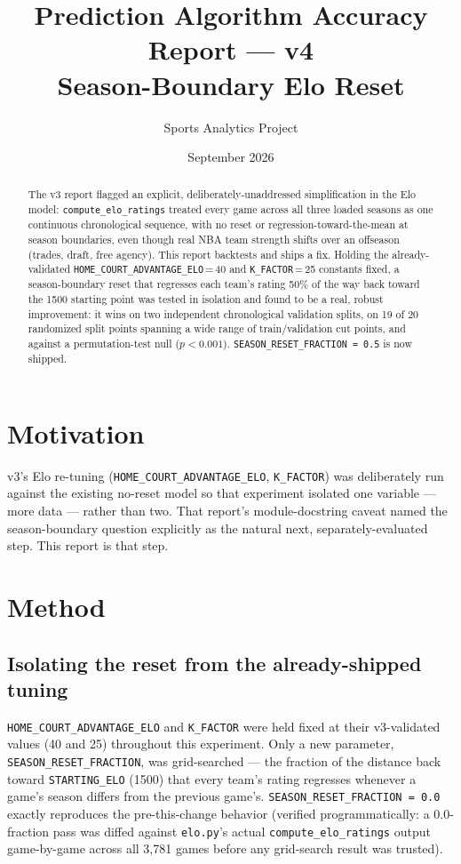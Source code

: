 \documentclass[11pt]{article}
\title{\textbf{Prediction Algorithm Accuracy Report — v4} \\ \large Season-Boundary Elo Reset}
\author{Sports Analytics Project}
\date{September 2026}
\newcommand{\code}[1]{\allowbreak\texttt{\small #1}\allowbreak}
\begin{document}
\maketitle

\begin{abstract}
\noindent The v3 report flagged an explicit, deliberately-unaddressed simplification in the Elo model:
\code{compute\_elo\_ratings} treated every game across all three loaded seasons as one continuous
chronological sequence, with no reset or regression-toward-the-mean at season boundaries, even though real
NBA team strength shifts over an offseason (trades, draft, free agency). This report backtests and ships a
fix. Holding the already-validated \code{HOME\_COURT\_ADVANTAGE\_ELO}\,=\,40 and \code{K\_FACTOR}\,=\,25
constants fixed, a season-boundary reset that regresses each team's rating 50\% of the way back toward the
1500 starting point was tested in isolation and found to be a real, robust improvement: it wins on two
independent chronological validation splits, on 19 of 20 randomized split points spanning a wide range of
train/validation cut points, and against a permutation-test null ($p < 0.001$). \code{SEASON\_RESET\_FRACTION
= 0.5} is now shipped.
\end{abstract}

\tableofcontents

\section{Motivation}

v3's Elo re-tuning (\code{HOME\_COURT\_ADVANTAGE\_ELO}, \code{K\_FACTOR}) was deliberately run against the
existing no-reset model so that experiment isolated one variable — more data — rather than two. That
report's module-docstring caveat named the season-boundary question explicitly as the natural next,
separately-evaluated step. This report is that step.

\section{Method}

\subsection{Isolating the reset from the already-shipped tuning}

\code{HOME\_COURT\_ADVANTAGE\_ELO} and \code{K\_FACTOR} were held fixed at their v3-validated values (40 and
25) throughout this experiment. Only a new parameter, \code{SEASON\_RESET\_FRACTION}, was grid-searched —
the fraction of the distance back toward \code{STARTING\_ELO} (1500) that every team's rating regresses
whenever a game's season differs from the previous game's. \code{SEASON\_RESET\_FRACTION = 0.0} exactly
reproduces the pre-this-change behavior (verified programmatically: a 0.0-fraction pass was diffed against
\code{elo.py}'s actual \code{compute\_elo\_ratings} output game-by-game across all 3,781 games before any
grid-search result was trusted).
\end{document}
